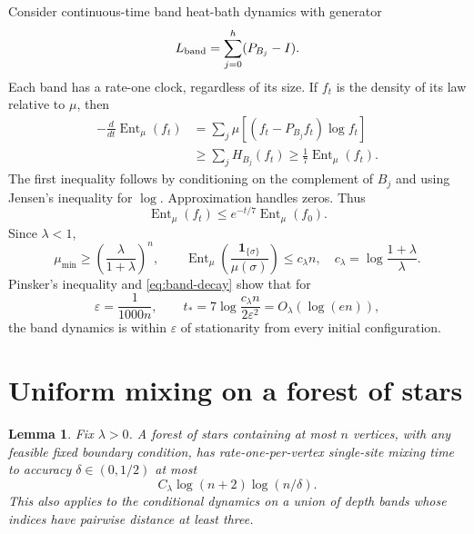 \documentclass[11pt]{article}
\newtheorem{lemma}[theorem]{Lemma}
\newcommand{\Ent}{\operatorname{Ent}}
\newcommand{\ind}{\mathbf 1}
\begin{document}
Consider continuous-time band heat-bath dynamics with generator
\[
L_{\rm band}=\sum_{j=0}^h(P_{B_j}-I).
\]
Each band has a rate-one clock, regardless of its size. If $f_t$ is the density of its law relative to $\mu$, then
\begin{align*}
-\frac{d}{dt}\Ent_\mu(f_t)
&=\sum_j\mu[(f_t-P_{B_j}f_t)\log f_t]\\
&\ge\sum_jH_{B_j}(f_t)
\ge\frac17\Ent_\mu(f_t).
\end{align*}
The first inequality follows by conditioning on the complement of $B_j$ and using Jensen's inequality for $\log$. Approximation handles zeros. Thus
\begin{equation}\label{eq:band-decay}
\Ent_\mu(f_t)\le e^{-t/7}\Ent_\mu(f_0).
\end{equation}
Since $\lambda<1$,
\[
\mu_{\min}\ge\left(\frac\lambda{1+\lambda}\right)^n,
\qquad
\Ent_\mu\left(\frac{\ind_{\{\sigma\}}}{\mu(\sigma)}\right)
\le c_\lambda n,
\quad c_\lambda=\log\frac{1+\lambda}{\lambda}.
\]
Pinsker's inequality and \eqref{eq:band-decay} show that for
\begin{equation}\label{eq:choices}
\varepsilon=\frac1{1000n},\qquad
t_* =7\log\frac{c_\lambda n}{2\varepsilon^2}=O_\lambda(\log(en)),
\end{equation}
the band dynamics is within $\varepsilon$ of stationarity from every initial configuration.

\section{Uniform mixing on a forest of stars}

\begin{lemma}\label{lem:stars}
Fix $\lambda>0$. A forest of stars containing at most $n$ vertices, with any feasible fixed boundary condition, has rate-one-per-vertex single-site mixing time to accuracy $\delta\in(0,1/2)$ at most
\[
C_\lambda\log(n+2)\log(n/\delta).
\]
This also applies to the conditional dynamics on a union of depth bands whose indices have pairwise distance at least three.
\end{lemma}
\end{document}
